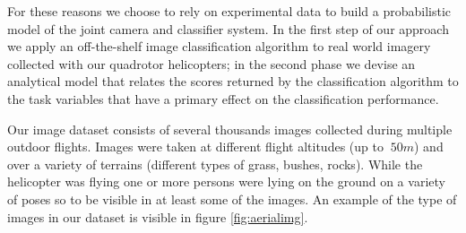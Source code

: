 \documentclass[a4paper,11pt]{report}
\begin{document}
For these reasons we choose to rely on experimental data to build a probabilistic model of the joint camera and classifier system. In the first step of our approach we apply an off-the-shelf image classification algorithm to real world imagery collected with our quadrotor helicopters; in the second phase we devise an analytical model that relates the scores returned by the classification algorithm to the task variables that have a primary effect on the classification performance.   

Our image dataset consists of several thousands images collected during multiple outdoor flights. Images were taken at different flight altitudes (up to $~50m$) and over a variety of terrains (different types of grass, bushes, rocks). While the helicopter was flying one or more persons were lying on the ground on a variety of poses so to be visible in at least some of the images. An example of the type of images in our dataset is visible in figure \ref{fig:aerialimg}. 
\end{document}
